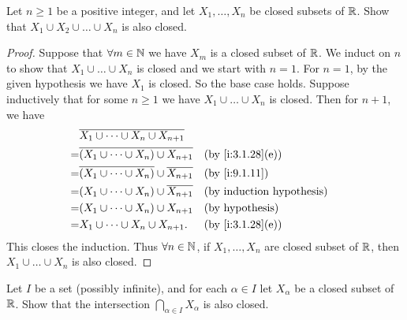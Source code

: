 \begin{ex}\label{i:ex:9.1.7}
  Let \(n \geq 1\) be a positive integer, and let \(X_1, \dots, X_n\) be closed subsets of \(\mathbb{R}\).
  Show that \(X_1 \cup X_2 \cup \dots \cup X_n\) is also closed.
\end{ex}

\begin{proof}
  Suppose that \(\forall m \in \mathbb{N}\) we have \(X_m\) is a closed subset of \(\mathbb{R}\).
  We induct on \(n\) to show that \(X_1 \cup \dots \cup X_n\) is closed and we start with \(n = 1\).
  For \(n = 1\), by the given hypothesis we have \(X_1\) is closed.
  So the base case holds.
  Suppose inductively that for some \(n \geq 1\) we have \(X_1 \cup \dots \cup X_n\) is closed.
  Then for \(n + 1\), we have
  \begin{align*}
      & \overline{X_1 \cup \dots \cup X_n \cup X_{n + 1}}                                          \\
    = & \overline{(X_1 \cup \dots \cup X_n) \cup X_{n + 1}}            &  & \by{i:3.1.28}[e]       \\
    = & \overline{(X_1 \cup \dots \cup X_n)} \cup \overline{X_{n + 1}} &  & \by{i:9.1.11}          \\
    = & (X_1 \cup \dots \cup X_n) \cup \overline{X_{n + 1}}            &  & \byIH                  \\
    = & (X_1 \cup \dots \cup X_n) \cup X_{n + 1}                       &  & \text{(by hypothesis)} \\
    = & X_1 \cup \dots \cup X_n \cup X_{n + 1}.                        &  & \by{i:3.1.28}[e]
  \end{align*}
  This closes the induction.
  Thus \(\forall n \in \mathbb{N}\), if \(X_1, \dots, X_n\) are closed subset of \(\mathbb{R}\), then \(X_1 \cup \dots \cup X_n\) is also closed.
\end{proof}

\begin{ex}\label{i:ex:9.1.8}
  Let \(I\) be a set (possibly infinite), and for each \(\alpha \in I\) let \(X_{\alpha}\) be a closed subset of \(\mathbb{R}\).
  Show that the intersection \(\bigcap_{\alpha \in I} X_{\alpha}\) is also closed.
\end{ex}

